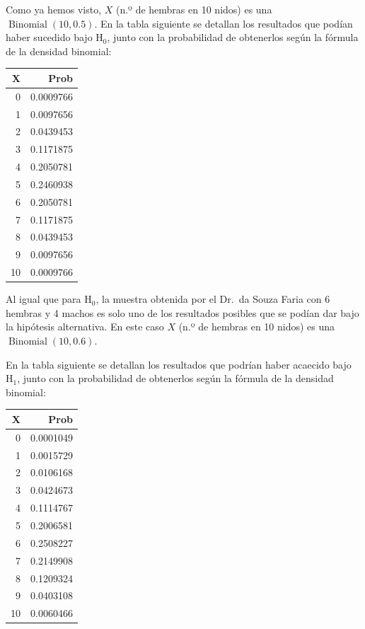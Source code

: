 \documentclass[
]{article}
\begin{document}
Como ya hemos visto, \(X\) (n.º de hembras en 10 nidos) es una \(\operatorname{Binomial}(10,0.5)\). En la tabla siguiente se detallan los resultados que podían haber sucedido bajo \(\mathrm{H}_{0}\), junto con la probabilidad de obtenerlos según la fórmula de la densidad binomial:

\begin{tabular}{r|r}
\hline
X & Prob\\
\hline
0 & 0.0009766\\
\hline
1 & 0.0097656\\
\hline
2 & 0.0439453\\
\hline
3 & 0.1171875\\
\hline
4 & 0.2050781\\
\hline
5 & 0.2460938\\
\hline
6 & 0.2050781\\
\hline
7 & 0.1171875\\
\hline
8 & 0.0439453\\
\hline
9 & 0.0097656\\
\hline
10 & 0.0009766\\
\hline
\end{tabular}

Al igual que para \(\mathrm{H}_{0}\), la muestra obtenida por el Dr.~da Souza Faria con 6 hembras y 4 machos es solo uno de los resultados posibles que se podían dar bajo la hipótesis alternativa. En este caso \(X\) (n.º de hembras en 10 nidos) es una \(\operatorname{Binomial}(10,0.6)\).

En la tabla siguiente se detallan los resultados que podrían haber acaecido bajo \(\mathrm{H}_{1}\), junto con la probabilidad de obtenerlos según la fórmula de la densidad binomial:

\begin{tabular}{r|r}
\hline
X & Prob\\
\hline
0 & 0.0001049\\
\hline
1 & 0.0015729\\
\hline
2 & 0.0106168\\
\hline
3 & 0.0424673\\
\hline
4 & 0.1114767\\
\hline
5 & 0.2006581\\
\hline
6 & 0.2508227\\
\hline
7 & 0.2149908\\
\hline
8 & 0.1209324\\
\hline
9 & 0.0403108\\
\hline
10 & 0.0060466\\
\hline
\end{tabular}
\end{document}
